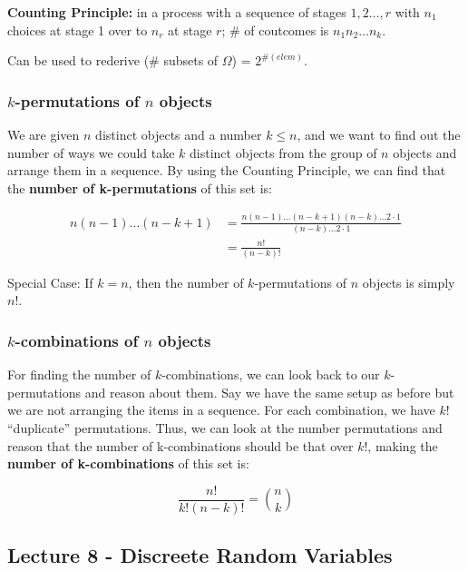 \documentclass{article}
\begin{document}
\textbf{Counting Principle:} in a process with a sequence of stages
$1, 2 \dots, r$ with $n_1$ choices at stage 1 over to $n_r$ at stage
$r$; \# of coutcomes is $n_1 n_2 \dots n_k$.

Can be used to rederive (\# subsets of $\Omega$) = $2^{\#(elem)}$.

\bigskip
\subsubsection{$k$-permutations of $n$ objects}

We are given $n$ distinct objects and a number $k \leq n$, and we want
to find out the number of ways we could take $k$ distinct objects from
the group of $n$ objects and arrange them in a sequence. By using the
Counting Principle, we can find that the \textbf{number of
  k-permutations} of this set is:

\begin{equation}
  \tag{K-permutations}
  \boxed{
    \begin{aligned}
      n (n-1) \dots (n-k+1)
      &= \frac{n (n-1) \dots (n-k+1) (n-k) \dots 2 \cdot 1}{(n-k)
        \dots 2 \cdot 1} \\
      &= \frac{n!}{(n-k)!}
    \end{aligned}
  }
\end{equation}

Special Case: If $k = n$, then the number of $k$-permutations of $n$
objects is simply $n!$.

\bigskip
\subsubsection{$k$-combinations of $n$ objects}

For finding the number of $k$-combinations, we can look back to our
$k$-permutations and reason about them. Say we have the same setup as
before but we are not arranging the items in a sequence. For each
combination, we have $k!$ ``duplicate'' permutations. Thus, we can
look at the number permutations and reason that the number of
k-combinations should be that over $k!$, making the \textbf{number of
  k-combinations} of this set is:

\begin{equation}
  \tag{K-combinations}
  \boxed{
    \frac{n!}{k!(n-k)!} = \binom{n}{k}
  }
\end{equation}


\subsection{Lecture 8 - Discreete Random Variables}
\end{document}
